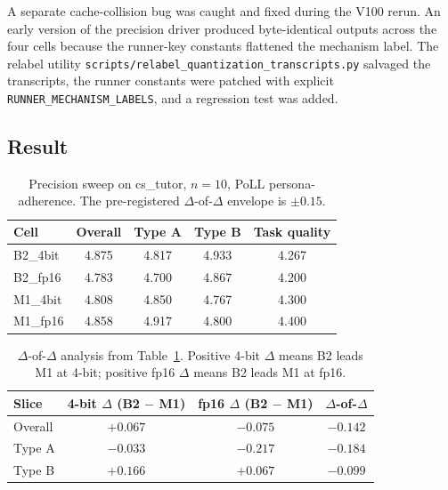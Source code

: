 A separate cache-collision bug was caught and fixed during the V100 rerun. An early version of the precision driver produced byte-identical outputs across the four cells because the runner-key constants flattened the mechanism label. The relabel utility \texttt{scripts/relabel\_quantization\_transcripts.py} salvaged the transcripts, the runner constants were patched with explicit \texttt{RUNNER\_MECHANISM\_LABELS}, and a regression test was added.

\subsection{Result}

\begin{table}[H]
  \centering
  \small
  \caption{Precision sweep on cs\_tutor, $n = 10$, PoLL persona-adherence. The pre-registered $\Delta$-of-$\Delta$ envelope is $\pm 0.15$.}
  \label{tab:precision-sweep}
  \begin{tabular}{lcccc}
    \toprule
    \textbf{Cell} & \textbf{Overall} & \textbf{Type A} & \textbf{Type B} & \textbf{Task quality} \\
    \midrule
    B2\_4bit  & 4.875 & 4.817 & 4.933 & 4.267 \\
    B2\_fp16  & 4.783 & 4.700 & 4.867 & 4.200 \\
    M1\_4bit  & 4.808 & 4.850 & 4.767 & 4.300 \\
    M1\_fp16  & 4.858 & 4.917 & 4.800 & 4.400 \\
    \bottomrule
  \end{tabular}
\end{table}

\begin{table}[H]
  \centering
  \small
  \caption{$\Delta$-of-$\Delta$ analysis from Table~\ref{tab:precision-sweep}. Positive 4-bit $\Delta$ means B2 leads M1 at 4-bit; positive fp16 $\Delta$ means B2 leads M1 at fp16.}
  \label{tab:delta-of-delta}
  \begin{tabular}{lccc}
    \toprule
    \textbf{Slice}  & \textbf{4-bit $\Delta$ (B2 $-$ M1)} & \textbf{fp16 $\Delta$ (B2 $-$ M1)} & \textbf{$\Delta$-of-$\Delta$} \\
    \midrule
    Overall & $+0.067$ & $-0.075$ & \textbf{$-0.142$} \\
    Type A  & $-0.033$ & $-0.217$ & $-0.184$ \\
    Type B  & $+0.166$ & $+0.067$ & $-0.099$ \\
    \bottomrule
  \end{tabular}
\end{table}

